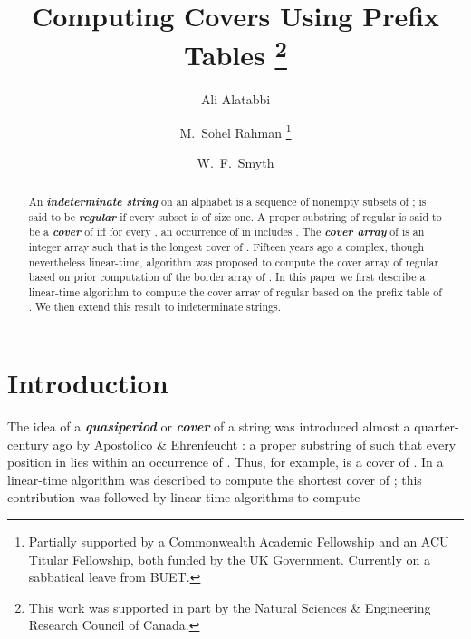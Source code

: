 \documentclass[runningheads,a4paper]{llncs}
\def\s#1{\mbox{\boldmath }}
\def\itbf#1{\textit{\textbf{#1}}}
\begin{document}
\pagestyle{headings}
\title{Computing Covers Using Prefix Tables
\thanks{This work was supported in part by the Natural Sciences \& Engineering
Research Council of Canada.}
}

 

\author{
Ali Alatabbi
\and 
M.\ Sohel Rahman
\thanks{Partially supported by a Commonwealth Academic Fellowship and
an ACU Titular Fellowship, both funded by the UK Government. Currently
on a sabbatical leave from BUET.}
\and 
W.\ F.\ Smyth
}




\maketitle
\begin{abstract}
An \itbf{indeterminate string}
 on an alphabet 
is a sequence of nonempty subsets of ;
\s{x} is said to be \itbf{regular} if every subset is of size one.
A proper substring \s{u} of regular \s{x} is said to be a \itbf{cover} of \s{x}
iff for every ,
an occurrence of \s{u} in \s{x} includes .
The \itbf{cover array}  of \s{x}
is an integer array such that  is the longest cover
of .
Fifteen years ago a complex, though nevertheless linear-time, algorithm
was proposed to compute the cover array of regular \s{x}
based on prior computation of the border array of \s{x}.
In this paper we first describe a linear-time algorithm
to compute the cover array of regular \s{x} based on the prefix table of \s{x}.
We then extend this result to indeterminate strings.
\end{abstract}

\section{Introduction}\label{sect-intro}
The idea of a \itbf{quasiperiod} or \itbf{cover} of a string \s{x}
was introduced almost a quarter-century ago by
Apostolico \& Ehrenfeucht \cite{AE90}:
a proper substring \s{u} of \s{x} such that every position in \s{x}
lies within an occurrence of \s{u}.
Thus, for example,  is a cover of
.
In \cite{AFI91} a linear-time algorithm was described
to compute the shortest cover of \s{x};
this contribution was followed by linear-time algorithms to compute
\end{document}
